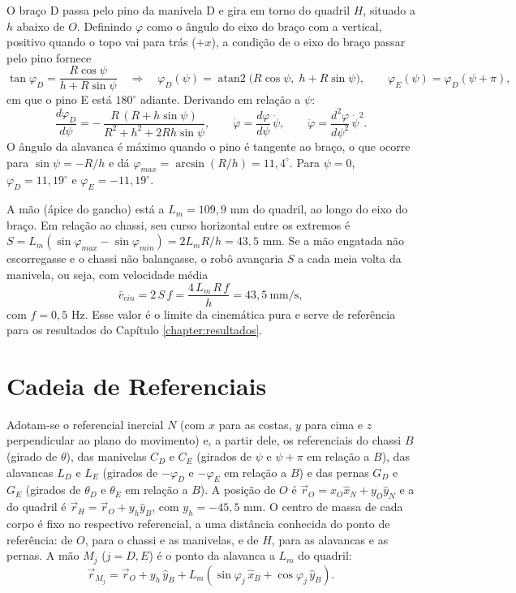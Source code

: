 O braço D passa pelo pino da manivela D e gira em torno do quadril $H$, situado a $h$ abaixo de $O$. Definindo $\varphi$ como o ângulo do eixo do braço com a vertical, positivo quando o topo vai para trás ($+x$), a condição de o eixo do braço passar pelo pino fornece
\begin{equation}
  \tan\varphi_D = \frac{R\cos\psi}{h + R\sin\psi}
  \quad\Rightarrow\quad
  \varphi_D(\psi)=\operatorname{atan2}\!\big(R\cos\psi,\;h+R\sin\psi\big),
  \qquad \varphi_E(\psi)=\varphi_D(\psi+\pi),
  \label{eq:phi}
\end{equation}
em que o pino E está $180^\circ$ adiante. Derivando em relação a $\psi$:
\begin{equation}
  \frac{d\varphi_D}{d\psi} = -\,\frac{R\,(R + h\sin\psi)}{R^{2}+h^{2}+2Rh\sin\psi},
  \qquad \dot\varphi = \frac{d\varphi}{d\psi}\,\dot\psi,
  \qquad \ddot\varphi = \frac{d^{2}\varphi}{d\psi^{2}}\,\dot\psi^{2}.
  \label{eq:dphi}
\end{equation}
O ângulo da alavanca é máximo quando o pino é tangente ao braço, o que ocorre para $\sin\psi=-R/h$ e dá $\varphi_{max}=\arcsin(R/h) = 11,4^\circ$. Para $\psi=0$, $\varphi_D=11,19^\circ$ e $\varphi_E=-11,19^\circ$.

A mão (ápice do gancho) está a $L_m=109{,}9$ mm do quadril, ao longo do eixo do braço. Em relação ao chassi, seu curso horizontal entre os extremos é $S=L_m(\sin\varphi_{max}-\sin\varphi_{min}) = 2L_mR/h = 43,5$ mm. Se a mão engatada não escorregasse e o chassi não balançasse, o robô avançaria $S$ a cada meia volta da manivela, ou seja, com velocidade média
\begin{equation}
  \bar v_{cin} = 2\,S\,f = \frac{4\,L_m\,R\,f}{h} = 43,5\ \text{mm/s},
  \label{eq:vcin}
\end{equation}
com $f = 0{,}5$ Hz. Esse valor é o limite da cinemática pura e serve de referência para os resultados do Capítulo \ref{chapter:resultados}.

\section{Cadeia de Referenciais}
\label{sec:cadeia}

Adotam-se o referencial inercial $N$ (com $x$ para as costas, $y$ para cima e $z$ perpendicular ao plano do movimento) e, a partir dele, os referenciais do chassi $B$ (girado de $\theta$), das manivelas $C_D$ e $C_E$ (girados de $\psi$ e $\psi+\pi$ em relação a $B$), das alavancas $L_D$ e $L_E$ (girados de $-\varphi_D$ e $-\varphi_E$ em relação a $B$) e das pernas $G_D$ e $G_E$ (girados de $\theta_D$ e $\theta_E$ em relação a $B$). A posição de $O$ é $\vec r_O = x_O\hat x_N + y_O\hat y_N$ e a do quadril é $\vec r_H = \vec r_O + y_h\hat y_B$, com $y_h=-45{,}5$ mm. O centro de massa de cada corpo é fixo no respectivo referencial, a uma distância conhecida do ponto de referência: de $O$, para o chassi e as manivelas, e de $H$, para as alavancas e as pernas. A mão $M_j$ ($j=D,E$) é o ponto da alavanca a $L_m$ do quadril:
\begin{equation}
  \vec{r}_{M_j} = \vec r_O + y_h\,\hat{y}_B + L_m\left(\sin\varphi_j\,\hat{x}_B + \cos\varphi_j\,\hat{y}_B\right).
  \label{eq:mao}
\end{equation}

